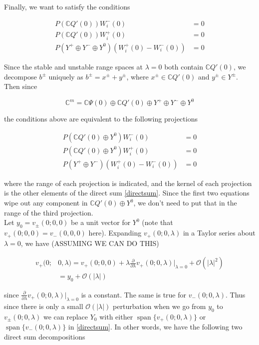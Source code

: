 \documentclass[12pt]{article}
\def\C{{\mathbb C}}
\DeclareMathOperator{\spn}{span}
\begin{document}
Finally, we want to satisfy the conditions

\begin{align*}
P(\C Q'(0))W_i^-(0) &= 0 \\
P(\C Q'(0))W_i^+(0) &= 0 \\
P(Y^+ \oplus Y^- \oplus Y^0) ( W_i^+(0) - W_i^-(0) ) &= 0
\end{align*}

Since the stable and unstable range spaces at $\lambda = 0$ both contain $\C Q'(0)$, we decompose $b^\pm$ uniquely as $b^\pm = x^\pm + y^\pm$, where $x^\pm \in \C Q'(0)$ and $y^\pm \in Y^\pm$. Then since

\begin{equation}\label{directsum}
\C^m = \C\Psi(0) \oplus \C Q'(0) \oplus Y^+ \oplus Y^- \oplus Y^0
\end{equation}

the conditions above are equivalent to the following projections

\begin{align*}
P(\C Q'(0) \oplus Y^0 )W_i^-(0) &= 0 \\
P(\C Q'(0) \oplus Y^0 )W_i^+(0) &= 0 \\
P(Y^+ \oplus Y^-) (W_i^+(0) - W_i^-(0) ) &= 0
\end{align*}

where the range of each projection is indicated, and the kernel of each projection is the other elements of the direct sum \eqref{directsum}. Since the first two equations wipe out any component in $\C Q'(0) \oplus Y^0$, we don't need to put that in the range of the third projection. \\

Let $y_0 = v_\pm(0; 0, 0)$ be a unit vector for $Y^0$ (note that $v_+(0; 0, 0) = v_-(0, 0, 0)$ here). Expanding $v_+(0; 0, \lambda)$ in a Taylor series about $\lambda = 0$, we have (ASSUMING WE CAN DO THIS)

\begin{align*}
v_+(0; &0, \lambda) = v_+(0; 0, 0) 
+ \lambda \frac{\partial}{\partial \lambda}v_+(0; 0, \lambda)\Big|_{\lambda = 0} 
+ \mathcal{O}(|\lambda|^2) \\
&= y_0 + \mathcal{O}(|\lambda|)
\end{align*}

since $\frac{\partial}{\partial \lambda}v_+(0; 0, \lambda)\Big|_{\lambda = 0}$ is a constant. The same is true for $v_-(0; 0, \lambda)$. Thus since there is only a small $\mathcal{O}(|\lambda|)$ perturbation when we go from $y_0$ to $v_\pm(0; 0, \lambda)$ we can replace $Y_0$ with either $\spn \{v_+(0; 0, \lambda) \}$ or $\spn \{v_-(0; 0, \lambda) \}$ in \eqref{directsum}. In other words, we have the following two direct sum decompositions
\end{document}
